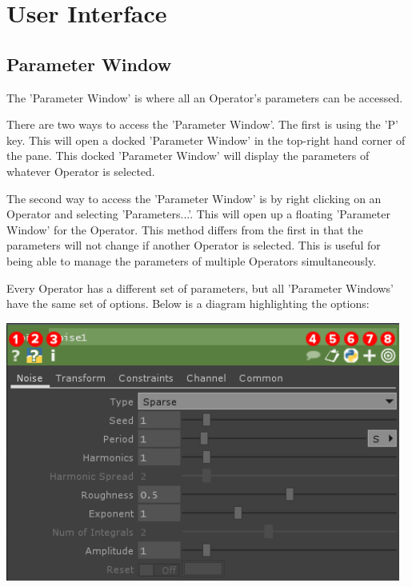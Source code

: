 \cleardoublepage
\chapter{User Interface}
\label{ch:2}

\section{Parameter Window}

\begin{fullwidth}

The 'Parameter Window' is where all an Operator's parameters can be accessed.

There are two ways to access the 'Parameter Window'. The first is using the 'P' key. This will open a docked 'Parameter Window' in the top-right hand corner of the pane. This docked 'Parameter Window' will display the parameters of whatever Operator is selected.

The second way to access the 'Parameter Window' is by right clicking on an Operator and selecting 'Parameters...'. This will open up a floating 'Parameter Window' for the Operator. This method differs from the first in that the parameters will not change if another Operator is selected. This is useful for being able to manage the parameters of multiple Operators simultaneously.

Every Operator has a different set of parameters, but all 'Parameter Windows' have the same set of options. Below is a diagram highlighting the options:

\begin{center}
\includegraphics[width=13cm]{./img/2.1/parameter-window.png}
\end{center}


\end{fullwidth}
